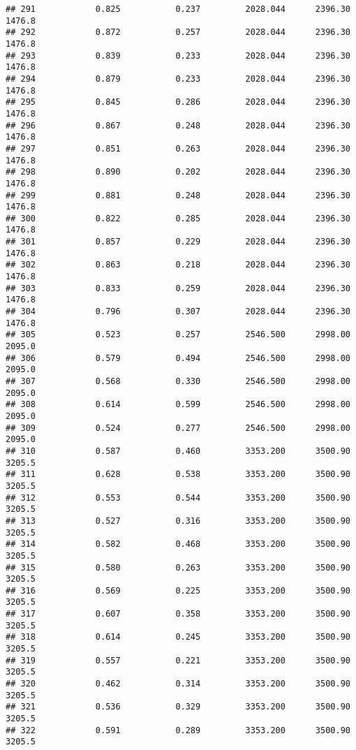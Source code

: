 \documentclass[
]{article}
\begin{document}
\begin{verbatim}
## 291            0.825           0.237         2028.044      2396.30       1476.8
## 292            0.872           0.257         2028.044      2396.30       1476.8
## 293            0.839           0.233         2028.044      2396.30       1476.8
## 294            0.879           0.233         2028.044      2396.30       1476.8
## 295            0.845           0.286         2028.044      2396.30       1476.8
## 296            0.867           0.248         2028.044      2396.30       1476.8
## 297            0.851           0.263         2028.044      2396.30       1476.8
## 298            0.890           0.202         2028.044      2396.30       1476.8
## 299            0.881           0.248         2028.044      2396.30       1476.8
## 300            0.822           0.285         2028.044      2396.30       1476.8
## 301            0.857           0.229         2028.044      2396.30       1476.8
## 302            0.863           0.218         2028.044      2396.30       1476.8
## 303            0.833           0.259         2028.044      2396.30       1476.8
## 304            0.796           0.307         2028.044      2396.30       1476.8
## 305            0.523           0.257         2546.500      2998.00       2095.0
## 306            0.579           0.494         2546.500      2998.00       2095.0
## 307            0.568           0.330         2546.500      2998.00       2095.0
## 308            0.614           0.599         2546.500      2998.00       2095.0
## 309            0.524           0.277         2546.500      2998.00       2095.0
## 310            0.587           0.460         3353.200      3500.90       3205.5
## 311            0.628           0.538         3353.200      3500.90       3205.5
## 312            0.553           0.544         3353.200      3500.90       3205.5
## 313            0.527           0.316         3353.200      3500.90       3205.5
## 314            0.582           0.468         3353.200      3500.90       3205.5
## 315            0.580           0.263         3353.200      3500.90       3205.5
## 316            0.569           0.225         3353.200      3500.90       3205.5
## 317            0.607           0.358         3353.200      3500.90       3205.5
## 318            0.614           0.245         3353.200      3500.90       3205.5
## 319            0.557           0.221         3353.200      3500.90       3205.5
## 320            0.462           0.314         3353.200      3500.90       3205.5
## 321            0.536           0.329         3353.200      3500.90       3205.5
## 322            0.591           0.289         3353.200      3500.90       3205.5

\end{verbatim}
\end{document}

